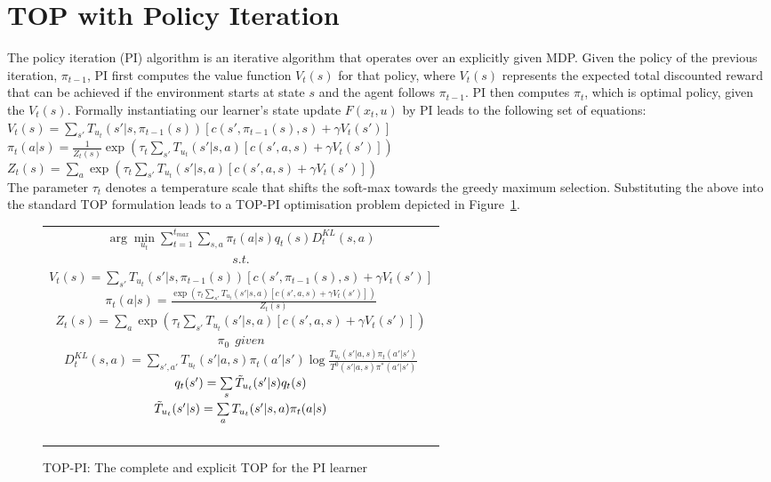
\section{TOP with Policy Iteration}\label{sec: TOP-PI}
The policy iteration (PI) algorithm is an iterative 
algorithm that operates over an explicitly given MDP. Given the policy
of the previous iteration, $\pi_{t-1}$, PI first computes 
the value function $V_t(s)$ for that policy, where  $V_t(s)$ represents
the expected total discounted reward that can be achieved if the
environment starts at state $s$ and the agent follows $\pi_{t-1}$.
PI then computes $\pi_{t}$, which is optimal policy, given the $V_t(s)$.
Formally instantiating our
learner's state update $F(x_t,u)$ by PI leads to the following set of
equations:
{\center 
$V_t(s)=\sum\limits_{s'}T_{u_t}(s'|s,\pi_{t-1}(s))\left[
c(s',\pi_{t-1}(s),s)+\gamma V_t(s')
\right]$\\
$\pi_t(a|s)=\frac{1}{Z_t(s)}\exp\left(\tau_t\sum\limits_{s'}T_{u_t}(s'|s,a)\left[
c(s',a,s)+\gamma V_t(s')
\right]\right)$\\
$Z_t(s)=\sum\limits_a\exp\left(\tau_t\sum\limits_{s'}T_{u_t}(s'|s,a)\left[
c(s',a,s)+\gamma V_t(s')
\right]\right)$\\
}
The parameter $\tau_t$ denotes a temperature scale that
shifts the soft-max towards the greedy maximum selection. Substituting
the above into the standard TOP formulation leads to a TOP-PI
optimisation problem depicted in Figure~\ref{t_opt_PI}.
\begin{figure}[th]
\begin{tabular}{|c|} \hline \parbox{3.2 in} {\center 
$\arg\min\limits_{u_t}\sum\limits_{t=1}^{t_{max}}\sum\limits_{s,a}\pi_t(a|s)q_t(s)D^{KL}_t(s,a)$\\
$s.t.$\\
$V_t(s)=\sum\limits_{s'}T_{u_t}(s'|s,\pi_{t-1}(s))\left[
c(s',\pi_{t-1}(s),s)+\gamma V_t(s')
\right]$\\
$\pi_t(a|s)=\frac{\exp\left(\tau_t\sum\limits_{s'}T_{u_t}(s'|s,a)\left[
c(s',a,s)+\gamma V_t(s')
\right]\right)}{Z_t(s)}$\\
$Z_t(s)=\sum\limits_a\exp\left(\tau_t\sum\limits_{s'}T_{u_t}(s'|s,a)\left[
c(s',a,s)+\gamma V_t(s')
\right]\right)$\\
$\pi_0\ \ \displaystyle{given}$\\
$D^{KL}_t(s,a)=\sum\limits_{s',a'}T_{u_t}(s'|a,s)\pi_t(a'|s')\log\frac{T_{u_t}(s'|a,s)\pi_t(a'|s')}{T^0(s'|a,s)\pi^*(a'|s')}$\\
$q_t(s')=\sum\limits_s\Tilde{T}_{u_t}(s'|s)q_t(s)$\\
$\Tilde{T}_{u_t}(s'|s)=\sum\limits_aT_{u_t}(s'|s,a)\pi_t(a|s)$\\\ \\
}\\ \hline \end{tabular}
\caption{\label{t_opt_PI}TOP-PI: The complete and explicit TOP for the
  PI learner}
\end{figure}
